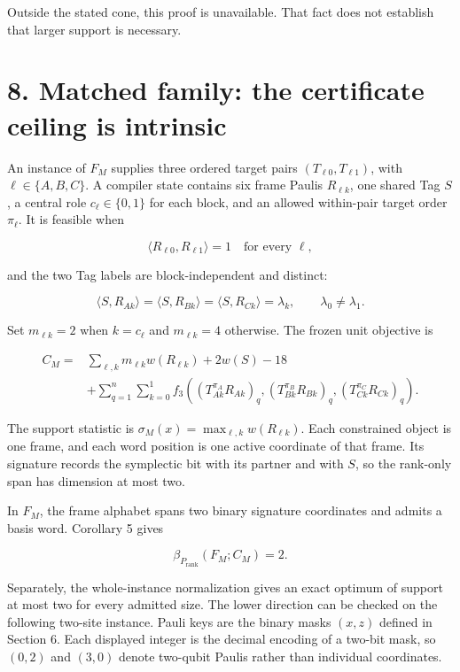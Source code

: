 \documentclass[11pt]{article}
\begin{document}
Outside the stated cone, this proof is unavailable. That fact does not establish that larger support is necessary.

\section*{8. Matched family: the certificate ceiling is intrinsic}\label{matched-family-the-certificate-ceiling-is-intrinsic}

An instance of \(F_M\) supplies three ordered target pairs \((T_{\ell0},T_{\ell1})\), with \(\ell\in\{A,B,C\}\). A compiler state contains six frame Paulis \(R_{\ell k}\), one shared Tag \(S\), a central role \(c_\ell\in\{0,1\}\) for each block, and an allowed within-pair target order \(\pi_\ell\). It is feasible when

\[
\langle R_{\ell0},R_{\ell1}\rangle=1
\quad\text{for every }\ell,
\]

and the two Tag labels are block-independent and distinct:

\[
\langle S,R_{A k}\rangle
=\langle S,R_{B k}\rangle
=\langle S,R_{C k}\rangle
=\lambda_k,
\qquad
\lambda_0\neq\lambda_1.
\]

Set \(m_{\ell k}=2\) when \(k=c_\ell\) and \(m_{\ell k}=4\) otherwise. The frozen unit objective is

\[
\begin{aligned}
C_M={}&
\sum_{\ell,k}m_{\ell k}w(R_{\ell k})+2w(S)-18\\
&+\sum_{q=1}^n\sum_{k=0}^1
f_3\!\left(
(T^{\pi_A}_{Ak}R_{Ak})_q,
(T^{\pi_B}_{Bk}R_{Bk})_q,
(T^{\pi_C}_{Ck}R_{Ck})_q
\right).
\end{aligned}
\]

The support statistic is \(\sigma_M(x)=\max_{\ell,k}w(R_{\ell k})\). Each constrained object is one frame, and each word position is one active coordinate of that frame. Its signature records the symplectic bit with its partner and with \(S\), so the rank-only span has dimension at most two.

In \(F_M\), the frame alphabet spans two binary signature coordinates and admits a basis word. Corollary 5 gives

\[
\beta_{P_{\mathrm{rank}}}(F_M;C_M)=2.
\]

Separately, the whole-instance normalization gives an exact optimum of support at most two for every admitted size. The lower direction can be checked on the following two-site instance. Pauli keys are the binary masks \((x,z)\) defined in Section 6. Each displayed integer is the decimal encoding of a two-bit mask, so \((0,2)\) and \((3,0)\) denote two-qubit Paulis rather than individual coordinates.
\end{document}
